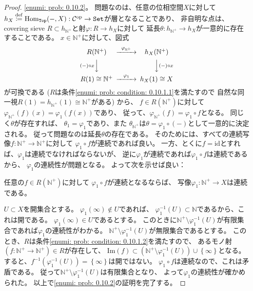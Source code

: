 \documentclass[uplatex]{jsarticle}
\theoremstyle{definition}
\def\id{\mathrm{id}}
\newcommand{\op}{\mathrm{op}}
\DeclareMathOperator{\Hom}{Hom}
\newcommand{\im}{\mathrm{Im}}
\def\N{\mathbb{N}}
\def\mcC{\mathcal{C}}
\newcommand{\dfn}{\overset{\mathrm{\tiny def}}{\coloneqq}}
\DeclareMathOperator{\sfSet}{\mathtt{Set}}
\DeclareMathOperator{\sfTop}{\mathtt{Top}}
\begin{document}
\begin{proof}
  \ref{enumi: prob: 0.10.2}。
  問題なのは、任意の位相空間\(X\)に対して
  \(h_X \dfn \Hom_{\sfTop}(-,X):\mcC^{\op}\to \sfSet\)が層となることであり、
  非自明な点は、
  covering sieve \(R\subset h_{\N^+}\)と射\(\varphi : R\to h_X\)に対して
  延長\(\theta:h_{\N^+}\to h_X\)が一意的に存在することである。
  \(x\in \N^+\)に対して、図式
  \[
  \begin{CD}
    R(\N^+) @>\varphi_{\N^+}>> h_X(\N^+) \\
    @V (-)\circ x VV @VV (-)\circ x V \\
    R(1)\cong \N^+ @>\varphi_1>> h_X(1)\cong X \\
  \end{CD}
  \]
  が可換である
  (\(R\)は条件\ref{enumi: prob: condition: 0.10.1.1}を満たすので
  自然な同一視\(R(1)=h_{\N^+}(1) \cong \N^+\)がある)
  から、
  \(f\in R(\N^+)\)に対して
  \(\varphi_{\N^+}(f)(x) = \varphi_1(f(x))\)であり、
  従って、\(\varphi_{\N^+}(f) = \varphi_1\circ f\)となる。
  同じく\(\theta\)が存在すれば、
  \(\theta_1=\varphi_1\)であり、また
  \(\theta_{\N^+}\)は\(\theta = \varphi_1\circ (-)\)として一意的に決定される。
  従って問題なのは延長\(\theta\)の存在である。
  そのためには、すべての連続写像\(f:\N^+\to \N^+\)に対して
  \(\varphi_1\circ f\)が連続であれば良い。
  一方、とくに\(f=\id\)とすれば、\(\varphi_1\)は連続でなければならないが、
  逆に\(\varphi_1\)が連続であれば\(\varphi_1\circ f\)は連続であるから、
  \(\varphi_1\)の連続性が問題となる。
  よって次を示せば良い：
  \begin{center}
    任意の\(f\in R(\N^+)\)に対して
    \(\varphi_1\circ f\)が連続となるならば、
    写像\(\varphi_1:\N^+\to X\)は連続である。
  \end{center}
  \(U\subset X\)を開集合とする。
  \(\varphi_1(\infty)\not\in U\)であれば、
  \(\varphi_1^{-1}(U)\subset \N\)であるから、これは開である。
  \(\varphi_1(\infty)\in U\)であるとする。
  このときに\(\N^+\setminus \varphi_1^{-1}(U)\)が有限集合であれば\(\varphi_1\)の連続性がわかる。
  \(\N^+\setminus \varphi_1^{-1}(U)\)が無限集合であるとする。
  このとき、\(R\)は条件\ref{enumi: prob: condition: 0.10.1.2}を満たすので、
  あるモノ射\((f:\N^+\to \N^+)\in R\)が存在して、
  \(\im(f) \subset (\N^+\setminus \varphi_1^{-1}(U))\cup\left\{ \infty\right\}\)となる。
  すると、\(f^{-1}(\varphi_1^{-1}(U)) = \left\{ \infty\right\}\)は開ではない。
  \(\varphi_1\circ f\)は連続なので、これは矛盾である。
  従って\(\N^+\setminus \varphi_1^{-1}(U)\)は有限集合となり、
  よって\(\varphi_1\)の連続性が確かめられた。
  以上で\ref{enumi: prob: 0.10.2}の証明を完了する。


\end{proof}
\end{document}
